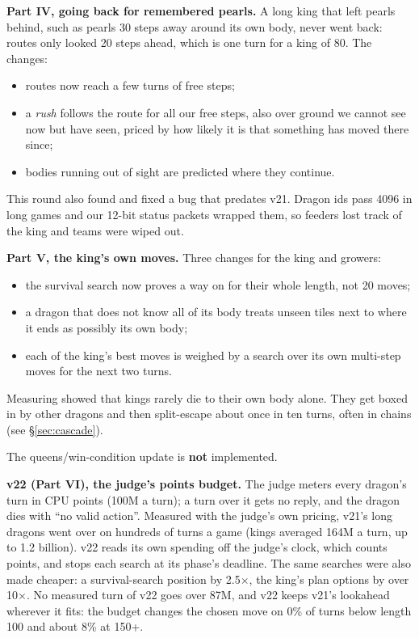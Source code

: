\documentclass[11pt,a4paper]{article}
\begin{document}
\textbf{Part IV, going back for remembered pearls.} A long king that left pearls behind, such as pearls 30 steps
away around its own body, never went back: routes only looked 20 steps ahead, which is one turn for a king of 80.
The changes:
\begin{itemize}
  \item routes now reach a few turns of free steps;
  \item a \emph{rush} follows the route for all our free steps, also over ground we cannot see now but have seen,
        priced by how likely it is that something has moved there since;
  \item bodies running out of sight are predicted where they continue.
\end{itemize}
This round also found and fixed a bug that predates v21. Dragon ids pass 4096 in long games and our 12-bit status
packets wrapped them, so feeders lost track of the king and teams were wiped out.

\textbf{Part V, the king's own moves.} Three changes for the king and growers:
\begin{itemize}
  \item the survival search now proves a way on for their whole length, not 20 moves;
  \item a dragon that does not know all of its body treats unseen tiles next to where it ends as possibly its own body;
  \item each of the king's best moves is weighed by a search over its own multi-step moves for the next two turns.
\end{itemize}
Measuring showed that kings rarely die to their own body alone. They get boxed in by other dragons and then
split-escape about once in ten turns, often in chains (see \S\ref{sec:cascade}).

The queens/win-condition update is \textbf{not} implemented.

\textbf{v22 (Part VI), the judge's points budget.} The judge meters every dragon's turn in CPU points (100M a turn); a
turn over it gets no reply, and the dragon dies with ``no valid action''. Measured with the judge's own pricing, v21's
long dragons went over on hundreds of turns a game (kings averaged 164M a turn, up to 1.2 billion). v22 reads its own
spending off the judge's clock, which counts points, and stops each search at its phase's deadline. The same searches
were also made cheaper: a survival-search position by 2.5$\times$, the king's plan options by over 10$\times$. No measured
turn of v22 goes over 87M, and v22 keeps v21's lookahead wherever it fits: the budget changes the chosen move on 0\% of
turns below length 100 and about 8\% at 150+.
\end{document}
